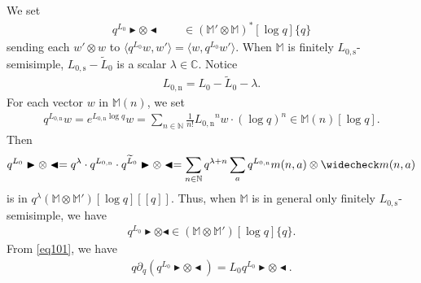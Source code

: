 \documentclass[12pt,a4paper,notitlepage]{article}
\theoremstyle{definition}
\theoremstyle{plain}
\newcommand{\wtd}{\widetilde}
\newcommand{\wch}{\widecheck}
\newcommand{\bk}[1]{\langle {#1}\rangle}
\newcommand{\Mbb}{\mathbb M}
\newcommand{\Cbb}{\mathbb C}
\newcommand{\Nbb}{\mathbb N}
\newcommand{\btl}{\blacktriangleleft}
\newcommand{\btr}{\blacktriangleright}
\newcommand{\Lss}{{L_{0,\mathrm{s}}}}
\newcommand{\Lni}{{L_{0,\mathrm{n}}}}
\numberwithin{equation}{section}
\begin{document}
We set
\begin{align}
q^{L_0}\btr\otimes\btl\qquad\in(\Mbb'\otimes\Mbb)^*[\log q]\{q\}\label{eq109}
\end{align}
sending each $w'\otimes w$ to $\bk{q^{L_0}w,w'}=\bk{w,q^{L_0}w'}$. When $\Mbb$ is finitely $\Lss$-semisimple, $\Lss-\wtd L_0$ is a scalar $\lambda\in\Cbb$.  Notice 
\begin{align}\label{eq100}
\Lni=L_0-\wtd L_0-\lambda.
\end{align}
For each vector $w$ in $\Mbb(n)$, we set
\begin{align*}
q^\Lni w=e^{\Lni\log q}w=\sum_{n\in\Nbb}\frac 1{n!}\Lni^nw\cdot (\log q)^n\in	\Mbb(n)[\log q].
\end{align*}
Then
\begin{align}
q^{L_0}\btr\otimes\btl=q^\lambda\cdot q^{\Lni}\cdot q^{\wtd L_0}\btr\otimes\btl=\sum_{n\in\Nbb}q^{\lambda+n}\sum_a q^\Lni m(n,a)\otimes\wch m(n,a)
\end{align}
is in $q^{\lambda}(\Mbb\otimes\Mbb')[\log q][[q]]$. Thus, when $\Mbb$ is in general only finitely $\Lss$-semisimple, we have
\begin{align}
q^{L_0}\btr\otimes\btl\in(\Mbb\otimes\Mbb')[\log q]\{q\}.	
\end{align}
From \eqref{eq101}, we have
\begin{align}
q\partial_q (q^{L_0}\btr\otimes\btl)=L_0q^{L_0}\btr\otimes\btl.\label{eq102}	
\end{align} 
\end{document}
